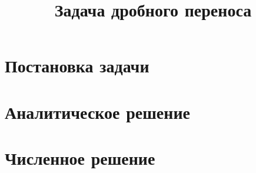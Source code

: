 \documentclass[12pt, russian, indentheadings]{report}
\begin{document}

\renewcommand{\labelitemi}{---}
\renewcommand{\labelitemii}{---}
\renewcommand{\labelitemiii}{---}
\renewcommand{\figurename}{Рисунок}
\renewcommand\thefigure{\Alph{part}.\arabic{chapter}.\arabic{figure}}
\renewcommand\thetable{\Alph{part}.\arabic{chapter}.\arabic{table}}
\frenchspacing

\title{Задача дробного переноса}


\chapter{Постановка задачи}


\chapter{Аналитическое решение}


\chapter{Численное решение}


%	
\end{document}
